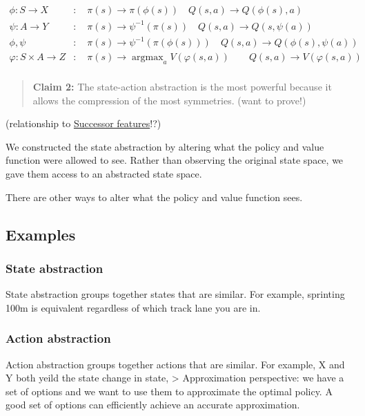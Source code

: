 \begin{align}
\phi: S \to X&: \quad \pi(s) \to \pi(\phi(s)) \quad Q(s, a) \to Q(\phi(s), a) \tag{State abstraction} \\
\psi: A\to Y&: \quad \pi(s) \to \psi^{-1}(\pi(s)) \quad Q(s, a) \to Q(s, \psi(a)) \tag{Action abstraction} \\
\phi, \psi&: \quad \pi(s) \to \psi^{-1}(\pi(\phi(s))) \quad Q(s, a) \to Q(\phi(s), \psi(a)) \tag{State and action abstraction} \\
\varphi: S \times A \to Z&: \quad \pi(s)\to \mathop{\text{argmax}}_a V(\varphi(s, a)) \quad\quad Q(s, a) \to V(\varphi(s, a)) \tag{State-action abstraction} \\
\end{align}

\begin{quote}
\textbf{Claim 2:} The state-action abstraction is the most powerful
because it allows the compression of the most symmetries. (want to
prove!)
\end{quote}

(relationship to
\href{http://www.gatsby.ucl.ac.uk/~dayan/papers/d93b.pdf}{Successor
features}!?)

We constructed the state abstraction by altering what the policy and
value function were allowed to see. Rather than observing the original
state space, we gave them access to an abstracted state space.

There are other ways to alter what the policy and value function sees.

\subsection{Examples}

\subsubsection{State abstraction}

State abstraction groups together states that are similar. For example,
sprinting 100m is equivalent regardless of which track lane you are in.

\subsubsection{Action abstraction}

Action abstraction groups together actions that are similar. For
example, X and Y both yeild the state change in state, \textgreater{}
Approximation perspective: we have a set of options and we want to use
them to approximate the optimal policy. A good set of options can
efficiently achieve an accurate approximation.

